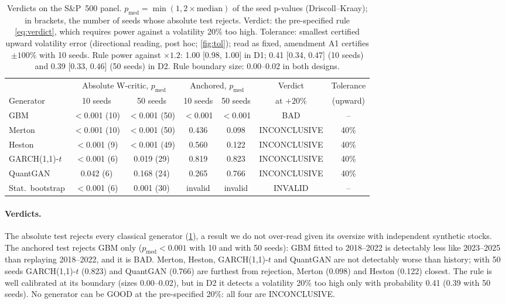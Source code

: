 \documentclass[11pt,a4paper]{article}
\theoremstyle{plain}
\newcommand{\pmed}{p_{\mathrm{med}}}
\newcommand{\GOOD}{\textsf{GOOD}}
\newcommand{\BAD}{\textsf{BAD}}
\newcommand{\INCONCL}{\textsf{INCONCLUSIVE}}
\newcommand{\INVALID}{\textsf{INVALID}}
\newcommand{\WC}{W-critic}
\newcommand{\GARCHt}{GARCH(1,1)-$t$}
\begin{document}
\begin{table}[t]
\centering
\caption{Verdicts on the S\&P~500 panel. $\pmed=\min(1,2\times\text{median})$ of the seed p-values
  (Driscoll--Kraay); in brackets, the number of seeds whose absolute test rejects. Verdict: the
  pre-specified rule \eqref{eq:verdict}, which requires power against a volatility 20\% too high.
  Tolerance: smallest certified upward volatility error (directional reading, post hoc;
  \cref{fig:tol}); read as fixed, amendment A1 certifies $\pm100\%$ with 10 seeds. Rule power
  against $\times1.2$: 1.00 [0.98, 1.00] in D1; 0.41 [0.34, 0.47] (10 seeds) and 0.39 [0.33, 0.46]
  (50 seeds) in D2. Rule boundary size: 0.00--0.02 in both designs.}
\label{tab:verdicts}
\small
\begin{tabular}{@{}lcccccc@{}}
\toprule
 & \multicolumn{2}{c}{Absolute \WC{}, $\pmed$} & \multicolumn{2}{c}{Anchored, $\pmed$} & Verdict & Tolerance \\
\cmidrule(lr){2-3}\cmidrule(lr){4-5}
Generator & 10 seeds & 50 seeds & 10 seeds & 50 seeds & at $+20\%$ & (upward) \\
\midrule
GBM & $<$0.001 (10) & $<$0.001 (50) & $<$0.001 & $<$0.001 & \BAD & -- \\
Merton & $<$0.001 (10) & $<$0.001 (50) & 0.436 & 0.098 & \INCONCL & 40\% \\
Heston & $<$0.001 (9) & $<$0.001 (49) & 0.560 & 0.122 & \INCONCL & 40\% \\
\GARCHt{} & $<$0.001 (6) & 0.019 (29) & 0.819 & 0.823 & \INCONCL & 40\% \\
QuantGAN & 0.042 (6) & 0.168 (24) & 0.265 & 0.766 & \INCONCL & 40\% \\
Stat.\ bootstrap & $<$0.001 (6) & 0.001 (30) & invalid & invalid & \INVALID & -- \\
\bottomrule
\end{tabular}
\end{table}

\paragraph{Verdicts.} The absolute test rejects every classical generator (\cref{tab:verdicts}), a
result we do not over-read given its oversize with independent synthetic stocks. The anchored test
rejects GBM only ($\pmed<0.001$ with 10 and with 50 seeds): GBM fitted to 2018--2022 is detectably
less like 2023--2025 than replaying 2018--2022, and it is \BAD. Merton, Heston, \GARCHt{} and
QuantGAN are not detectably worse than history; with 50 seeds \GARCHt{} (0.823) and QuantGAN (0.766)
are furthest from rejection, Merton (0.098) and Heston (0.122) closest. The rule is well calibrated
at its boundary (sizes 0.00--0.02), but in D2 it detects a volatility 20\% too high only with
probability 0.41 (0.39 with 50 seeds). No generator can be \GOOD{} at the pre-specified 20\%: all
four are \INCONCL{}.
\end{document}
